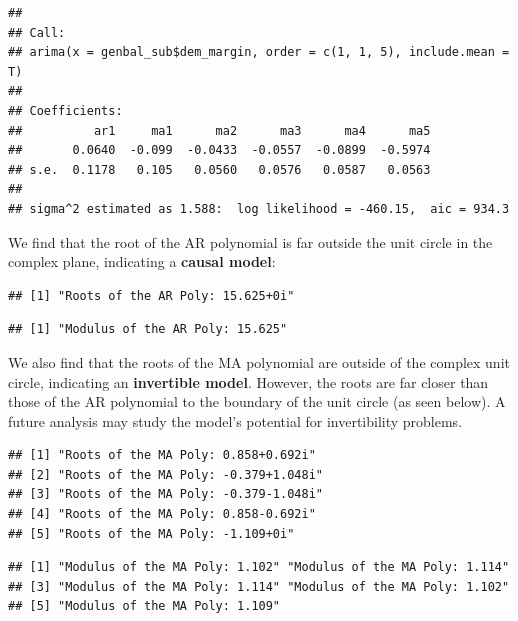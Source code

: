 \documentclass[]{article}
\newenvironment{Shaded}{\begin{snugshade}}{\end{snugshade}}
\newcommand{\KeywordTok}[1]{\textcolor[rgb]{0.13,0.29,0.53}{\textbf{#1}}}
\newcommand{\DataTypeTok}[1]{\textcolor[rgb]{0.13,0.29,0.53}{#1}}
\newcommand{\DecValTok}[1]{\textcolor[rgb]{0.00,0.00,0.81}{#1}}
\newcommand{\StringTok}[1]{\textcolor[rgb]{0.31,0.60,0.02}{#1}}
\newcommand{\OperatorTok}[1]{\textcolor[rgb]{0.81,0.36,0.00}{\textbf{#1}}}
\newcommand{\NormalTok}[1]{#1}
\begin{document}
\begin{Shaded}
\end{Shaded}

\begin{verbatim}
## 
## Call:
## arima(x = genbal_sub$dem_margin, order = c(1, 1, 5), include.mean = T)
## 
## Coefficients:
##          ar1     ma1      ma2      ma3      ma4      ma5
##       0.0640  -0.099  -0.0433  -0.0557  -0.0899  -0.5974
## s.e.  0.1178   0.105   0.0560   0.0576   0.0587   0.0563
## 
## sigma^2 estimated as 1.588:  log likelihood = -460.15,  aic = 934.3
\end{verbatim}

We find that the root of the AR polynomial is far outside the unit
circle in the complex plane, indicating a \textbf{causal model}:

\begin{verbatim}
## [1] "Roots of the AR Poly: 15.625+0i"
\end{verbatim}

\begin{verbatim}
## [1] "Modulus of the AR Poly: 15.625"
\end{verbatim}

We also find that the roots of the MA polynomial are outside of the
complex unit circle, indicating an \textbf{invertible model}. However,
the roots are far closer than those of the AR polynomial to the boundary
of the unit circle (as seen below). A future analysis may study the
model's potential for invertibility problems.

\begin{verbatim}
## [1] "Roots of the MA Poly: 0.858+0.692i" 
## [2] "Roots of the MA Poly: -0.379+1.048i"
## [3] "Roots of the MA Poly: -0.379-1.048i"
## [4] "Roots of the MA Poly: 0.858-0.692i" 
## [5] "Roots of the MA Poly: -1.109+0i"
\end{verbatim}

\begin{verbatim}
## [1] "Modulus of the MA Poly: 1.102" "Modulus of the MA Poly: 1.114"
## [3] "Modulus of the MA Poly: 1.114" "Modulus of the MA Poly: 1.102"
## [5] "Modulus of the MA Poly: 1.109"
\end{verbatim}
\end{document}
